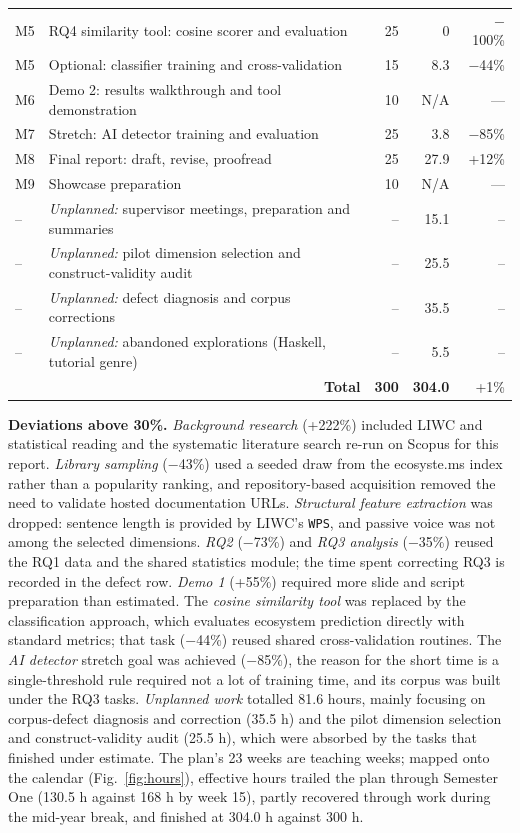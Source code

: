 \documentclass[conference]{IEEEtran}
\begin{document}
\begin{table}[htbp]
\begin{tabular}{@{}l p{} r r r@{}}
\midrule
M5 & RQ4 similarity tool: cosine scorer and evaluation  & 25   & 0    & $-$100\% \\
M5 & Optional: classifier training and cross-validation & 15   & 8.3  & $-$44\% \\
\midrule
M6 & Demo 2: results walkthrough and tool demonstration & 10   & N/A  & --- \\
M7 & Stretch: AI detector training and evaluation       & 25   & 3.8  & $-$85\% \\
M8 & Final report: draft, revise, proofread             & 25   & 27.9 & +12\% \\
M9 & Showcase preparation                               & 10   & N/A  & --- \\
\midrule
-- & \emph{Unplanned:} supervisor meetings, preparation and summaries & -- & 15.1 & -- \\
-- & \emph{Unplanned:} pilot dimension selection and construct-validity audit & -- & 25.5 & -- \\
-- & \emph{Unplanned:} defect diagnosis and corpus corrections & -- & 35.5 & -- \\
-- & \emph{Unplanned:} abandoned explorations (Haskell, tutorial genre) & -- & 5.5 & -- \\
\midrule
\multicolumn{2}{r}{\textbf{Total}} & \textbf{300} & \textbf{304.0} & +1\% \\
\bottomrule
\end{tabular}
\end{table}

\textbf{Deviations above 30\%.}
\emph{Background research} (+222\%) included LIWC and statistical reading and the
systematic literature search re-run on Scopus for this report.
\emph{Library sampling} ($-$43\%) used a seeded draw from the ecosyste.ms index
rather than a popularity ranking, and repository-based acquisition removed the
need to validate hosted documentation URLs.
\emph{Structural feature extraction} was dropped: sentence length is provided by
LIWC's \texttt{WPS}, and passive voice was not among the selected dimensions.
\emph{RQ2} ($-$73\%) and \emph{RQ3 analysis} ($-$35\%) reused the RQ1 data and the
shared statistics module; the time spent correcting RQ3 is recorded in the
defect row.
\emph{Demo 1} (+55\%) required more slide and script preparation than estimated.
The \emph{cosine similarity tool} was replaced by the classification approach,
which evaluates ecosystem prediction directly with standard metrics; that task
($-$44\%) reused shared cross-validation routines.
The \emph{AI detector} stretch goal was achieved ($-$85\%), the reason for the short time is a single-threshold
rule required not a lot of training time, and its corpus was built under the RQ3 tasks.
\emph{Unplanned work} totalled 81.6 hours, mainly focusing on corpus-defect diagnosis and
correction (35.5 h) and the pilot dimension selection and construct-validity
audit (25.5 h), which were absorbed by the tasks that finished under estimate.
The plan's 23 weeks are teaching weeks; mapped onto the calendar
(Fig.~\ref{fig:hours}), effective hours trailed the plan through Semester One
(130.5 h against 168 h by week 15), partly recovered through work during the
mid-year break, and finished at 304.0 h against 300 h.
\end{document}
